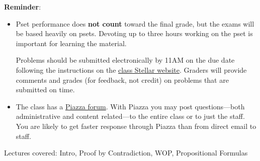 \documentclass[handout]{mcs}
\begin{document}
\renewcommand{\reading}{
\begin{itemize}
\item Chapter~\bref{proofs_chap}{.\ \emph{What is a Proof?}}

\item  Chapter~\bref{well_ordering_chap}{.\ \emph{The Well Ordering
      Principle}} through~\bref{factor_sec}{;}
  (omit~\bref{well_ordering_sec}{.\ \emph{Well Ordered Sets}}).

  Chapter~\bref{logicform_chap}{.\ \emph{Logical Formulas}}
  through~\bref{equiv_valid_sec}, and~\bref{SAT_sec}{;}
  (optional:~\bref{prop_algebra_sec}{.})
\end{itemize}
These assigned readings do \textbf{not}
  include the Problem sections.  (Many of the problems in the text
  will appear as class or homework problems.)}


\medskip

\textbf{Reminder}:

\begin{itemize}

\item Pset performance does \textbf{not count} toward the final grade,
  but the exams will be based heavily on psets.  Devoting up to three
  hours working on the pset is important for learning the material.

  Problems should be submitted electronically by 11AM on the due date
  following the instructions on the
  \href{https://stellar.mit.edu/S/course/6/fa15/6.042}{class Stellar
    website}.  Graders will provide comments and grades (for feedback,
  not credit) on problems that are submitted on time.

\item The class has a
  \href{http://piazza.com/mit/fall2015/6042j18062j/home} {Piazza
    forum}.  With Piazza you may post questions---both administrative
  and content related---to the entire class or to just the staff.  You
  are likely to get faster response through Piazza than from direct
  email to staff.

\iffalse
Posting a question or comment to Piazza is required during both the
first and second weeks of the class; after that Piazza use is
optional.
\fi

\end{itemize}

\begin{staffnotes}
Lectures covered: Intro, Proof by Contradiction, WOP, Propositional Formulas
\end{staffnotes}
\end{document}

